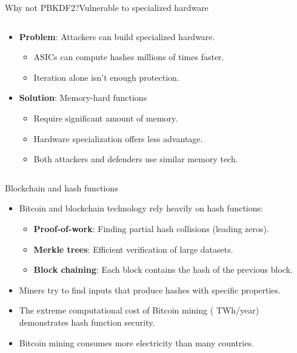 \documentclass[aspectratio=169, lualatex, handout]{beamer}
\begin{document}
\begin{frame}{Why not PBKDF2?}{Vulnerable to specialized hardware}
	\begin{columns}[c]
		\begin{column}{0.6\textwidth}
			\begin{itemize}
				\item \textbf{Problem}: Attackers can build specialized hardware.
				      \begin{itemize}
					      \item ASICs can compute hashes millions of times faster.
					      \item Iteration alone isn't enough protection.
				      \end{itemize}
				\item \textbf{Solution}: Memory-hard functions
				      \begin{itemize}
					      \item Require significant amount of memory.
					      \item Hardware specialization offers less advantage.
					      \item Both attackers and defenders use similar memory tech.
				      \end{itemize}
			\end{itemize}
		\end{column}
		\begin{column}{0.4\textwidth}
		\end{column}
	\end{columns}
\end{frame}

\begin{frame}{Blockchain and hash functions}
	\begin{itemize}
		\item Bitcoin and blockchain technology rely heavily on hash functions:
		      \begin{itemize}
			      \item \textbf{Proof-of-work}: Finding partial hash collisions (leading zeros).
			      \item \textbf{Merkle trees}: Efficient verification of large datasets.
			      \item \textbf{Block chaining}: Each block contains the hash of the previous block.
		      \end{itemize}
		\item Miners try to find inputs that produce hashes with specific properties.
		\item The extreme computational cost of Bitcoin mining ( TWh/year) demonstrates hash function security.
		\item Bitcoin mining consumes more electricity than many countries.
	\end{itemize}
\end{frame}
\end{document}
